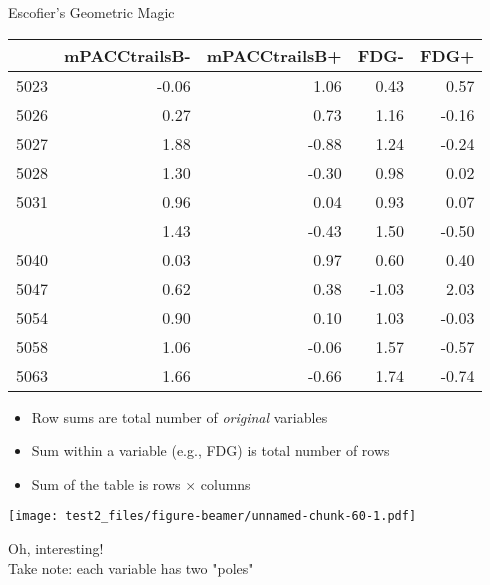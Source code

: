 \documentclass[
  ignorenonframetext,
]{beamer}
\providecommand{\tightlist}{%
  \setlength{\itemsep}{0pt}\setlength{\parskip}{0pt}}
\begin{document}
\begin{frame}{Escofier's Geometric Magic}
\protect\hypertarget{escofiers-geometric-magic-2}{}

\begin{table}[H]
\centering\begingroup\fontsize{7}{9}\selectfont

\begin{tabular}{lrrrr}
\toprule
  & mPACCtrailsB- & mPACCtrailsB+ & FDG- & FDG+\\
\midrule
5023 & -0.06 & 1.06 & 0.43 & 0.57\\
5026 & 0.27 & 0.73 & 1.16 & -0.16\\
5027 & 1.88 & -0.88 & 1.24 & -0.24\\
5028 & 1.30 & -0.30 & 0.98 & 0.02\\
5031 & 0.96 & 0.04 & 0.93 & 0.07\\
\addlinespace
5037 & 1.43 & -0.43 & 1.50 & -0.50\\
5040 & 0.03 & 0.97 & 0.60 & 0.40\\
5047 & 0.62 & 0.38 & -1.03 & 2.03\\
5054 & 0.90 & 0.10 & 1.03 & -0.03\\
5058 & 1.06 & -0.06 & 1.57 & -0.57\\
5063 & 1.66 & -0.66 & 1.74 & -0.74\\
\bottomrule
\end{tabular}\endgroup{}
\end{table}

\begin{itemize}[<+->]
\tightlist
\item
  Row sums are total number of \emph{original} variables
\item
  Sum within a variable (e.g., FDG) is total number of rows
\item
  Sum of the table is rows \(\times\) columns
\end{itemize}

\end{frame}

\begin{frame}

\texttt{[image: test2\_files/figure-beamer/unnamed-chunk-60-1.pdf]}

\begin{center}Oh, interesting!\\
Take note: each variable has two "poles"\end{center}

\end{frame}
\end{document}
